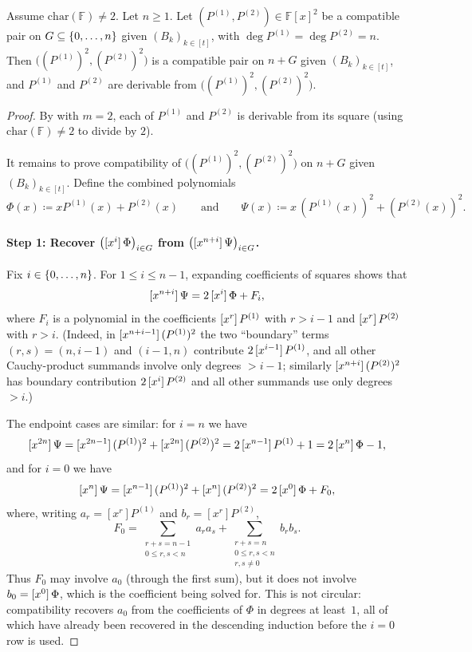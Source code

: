 \begin{lemma}\label{lem:compatible-power}
    Assume $\mathrm{char}(\mathbb{F})\ne 2$.
    Let $n\ge1$.
    Let $(P^{(1)}, P^{(2)}) \in \mathbb{F}[x]^2$ be a compatible pair on $G \subseteq \idx{n}$ given $(B_k)_{k \in [t]}$, with $\deg P^{(1)}=\deg P^{(2)}=n$.
    Then $\bigl((P^{(1)})^2, (P^{(2)})^2\bigr)$ is a compatible pair on $n + G$ given $(B_k)_{k \in [t]}$, and $P^{(1)}$ and $P^{(2)}$ are derivable from $\bigl((P^{(1)})^2, (P^{(2)})^2\bigr)$.
\end{lemma}
\begin{proof}
    By  with $m=2$, each of $P^{(1)}$ and $P^{(2)}$ is derivable from its square (using $\mathrm{char}(\mathbb{F})\ne 2$ to divide by $2$).

    It remains to prove compatibility of $\bigl((P^{(1)})^2,(P^{(2)})^2\bigr)$ on $n+G$ given $(B_k)_{k\in[t]}$.
    Define the combined polynomials
    \[
        \Phi(x)\coloneqq xP^{(1)}(x)+P^{(2)}(x)
        \qquad\text{and}\qquad
        \Psi(x)\coloneqq x\,(P^{(1)}(x))^2 + (P^{(2)}(x))^2.
    \]

    \paragraph{Step 1: Recover $\bigl(\coeff{\Phi}{i}\bigr)_{i\in G}$ from $\bigl(\coeff{\Psi}{n+i}\bigr)_{i\in G}$.}
    Fix $i\in\idx{n}$.
    For $1\le i\le n-1$, expanding coefficients of squares shows that
    \[
        \coeff{\Psi}{n+i}
        = 2\,\coeff{\Phi}{i} + F_i,
    \]
    where $F_i$ is a polynomial in the coefficients $\coeff{P^{(1)}}{r}$ with $r>i-1$ and $\coeff{P^{(2)}}{r}$ with $r>i$.
    (Indeed, in $\coeff{(P^{(1)})^2}{n+i-1}$ the two ``boundary'' terms $(r,s)=(n,i-1)$ and $(i-1,n)$ contribute $2\,\coeff{P^{(1)}}{i-1}$, and all other Cauchy-product summands involve only degrees $>i-1$; similarly $\coeff{(P^{(2)})^2}{n+i}$ has boundary contribution $2\,\coeff{P^{(2)}}{i}$ and all other summands use only degrees $>i$.)

    The endpoint cases are similar: for $i=n$ we have
    \[
        \coeff{\Psi}{2n}
        = \coeff{(P^{(1)})^2}{2n-1}+\coeff{(P^{(2)})^2}{2n}
        = 2\,\coeff{P^{(1)}}{n-1}+1
        = 2\,\coeff{\Phi}{n}-1,
    \]
    and for $i=0$ we have
    \[
        \coeff{\Psi}{n}
        = \coeff{(P^{(1)})^2}{n-1}+\coeff{(P^{(2)})^2}{n}
        = 2\,\coeff{\Phi}{0} + F_0,
    \]
    where, writing $a_r=[x^r]P^{(1)}$ and $b_r=[x^r]P^{(2)}$,
    \[
      F_0=
        \sum_{\substack{r+s=n-1\\0\le r,s<n}}a_ra_s
        +\sum_{\substack{r+s=n\\0\le r,s<n\\r,s\ne0}}b_rb_s .
    \]
    Thus $F_0$ may involve $a_0$ (through the first sum), but it does not
    involve $b_0=\coeff{\Phi}{0}$, which is the coefficient being solved for.
    This is not circular: compatibility recovers $a_0$ from the coefficients
    of $\Phi$ in degrees at least~$1$, all of which have already been
    recovered in the descending induction before the $i=0$ row is used.


\end{proof}
